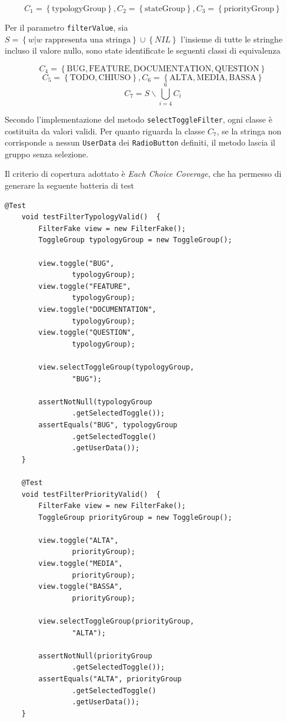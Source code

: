 \noindent$$C_{1} =\left\{\text{typologyGroup}\right\},
C_{2} =\left\{\text{stateGroup}\right\},
C_{3} =\left\{\text{priorityGroup}\right\}$$

\noindent Per il parametro \texttt{filterValue}, sia $S = \left\{ w|w \text{ rappresenta una stringa} \right\}\cup \left\{ \textit{NIL} \right\}$  
l'insieme di tutte le stringhe incluso il valore nullo, sono state identificate
le seguenti classi di equivalenza

\noindent$$C_{4} =\left\{\text{BUG},\text{FEATURE},\text{DOCUMENTATION},\text{QUESTION}\right\}$$
$$C_{5} =\left\{\text{TODO},\text{CHIUSO}\right\},C_{6} =\left\{\text{ALTA},\text{MEDIA},\text{BASSA}\right\}$$
$$C_{7} = S\smallsetminus \bigcup_{i=4}^{6}C_{i}$$

\noindent Secondo l'implementazione del metodo \texttt{selectToggleFilter}, ogni classe è costituita da valori validi.
Per quanto riguarda la classe $C_7$, se la stringa non corrisponde a nessun \texttt{UserData} dei 
\texttt{RadioButton} definiti, il metodo lascia il gruppo senza selezione.

\noindent Il criterio di copertura adottato è \textit{Each Choice Coverage}, che ha permesso
di generare la seguente batteria di test

\begin{listing}[!ht]
\begin{verbatim}
@Test
    void testFilterTypologyValid()  {
        FilterFake view = new FilterFake();
        ToggleGroup typologyGroup = new ToggleGroup();

        view.toggle("BUG",
                typologyGroup);
        view.toggle("FEATURE",
                typologyGroup);
        view.toggle("DOCUMENTATION",
                typologyGroup);
        view.toggle("QUESTION",
                typologyGroup);

        view.selectToggleGroup(typologyGroup,
                "BUG");

        assertNotNull(typologyGroup
                .getSelectedToggle());
        assertEquals("BUG", typologyGroup
                .getSelectedToggle()
                .getUserData());
    }

    @Test
    void testFilterPriorityValid()  {
        FilterFake view = new FilterFake();
        ToggleGroup priorityGroup = new ToggleGroup();

        view.toggle("ALTA",
                priorityGroup);
        view.toggle("MEDIA",
                priorityGroup);
        view.toggle("BASSA",
                priorityGroup);

        view.selectToggleGroup(priorityGroup,
                "ALTA");

        assertNotNull(priorityGroup
                .getSelectedToggle());
        assertEquals("ALTA", priorityGroup
                .getSelectedToggle()
                .getUserData());
    }
\end{verbatim}
\end{listing}

